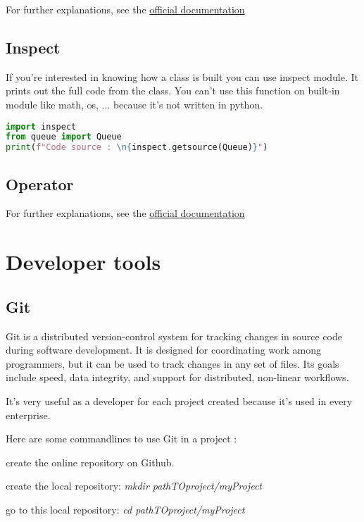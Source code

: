 \documentclass[a4paper, 12pt, titlepage]{scrartcl} %
\begin{document}
\vspace{5mm}

For further explanations, see the \href{https://docs.python.org/3/library/threading.html}{official documentation}


\subsection{Inspect}
If you're interested in knowing how a class is built you can use inspect module. It prints out the full code from the class. You can't use this function on built-in module like math, os, ... because it's not written in python.
\begin{lstlisting}[language=Python]
import inspect
from queue import Queue
print(f"Code source : \n{inspect.getsource(Queue)}")
\end{lstlisting} \vspace{5mm}

\subsection{Operator}
\label{subsec:Operator}
For further explanations, see the \href{https://docs.python.org/3/library/operator.html}{official documentation}

\newpage
\section{Developer tools}
\subsection{Git}
Git is a distributed version-control system for tracking changes in source code during software development. It is designed for coordinating work among programmers, but it can be used to track changes in any set of files. Its goals include speed, data integrity, and support for distributed, non-linear workflows.

It's very useful as a developer for each project created because it's used in every enterprise.

\vspace{5mm}

Here are some commandlines to use Git in a project :

create the online repository on Github.

create the local repository: \textit{mkdir pathTOproject/myProject}

go to this local repository: \textit{cd pathTOproject/myProject}
\end{document}

